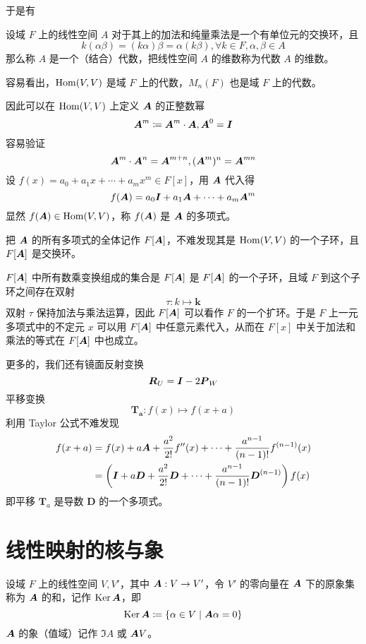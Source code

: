 于是有

\begin{definition}[代数]
    设域 $F$ 上的线性空间 $A$ 对于其上的加法和纯量乘法是一个有单位元的交换环，且
    \[ k(\alpha \beta) = (k\alpha)\beta = \alpha(k\beta), \forall k \in F,\alpha,\beta \in A \]
    那么称 $A$ 是一个（结合）代数，把线性空间 $A$ 的维数称为代数 $A$ 的维数。
\end{definition}

容易看出，$\operatorname{Hom}(V,V)$ 是域 $F$ 上的代数，$M_n(F)$ 也是域 $F$ 上的代数。

因此可以在 $\operatorname{Hom}(V,V)$ 上定义 $\boldsymbol{A}$ 的正整数幂
\[ \boldsymbol{A}^m \coloneqq \boldsymbol{A}^m \cdot \boldsymbol{A}, \boldsymbol{A}^0 = \boldsymbol{I} \]
容易验证
\[ \boldsymbol{A}^m \cdot \boldsymbol{A}^n = \boldsymbol{A}^{m+n}, (\boldsymbol{A}^m)^n = \boldsymbol{A}^{mn} \]
设 $f(x) = a_0 + a_1 x + \cdots + a_mx^m \in F[x]$，用 $\boldsymbol{A}$ 代入得
\[ f(\boldsymbol{A}) = a_0\boldsymbol{I} + a_1\boldsymbol{A} + \cdots + a_m \boldsymbol{A}^m \]
显然 $f(\boldsymbol{A}) \in \operatorname{Hom}(V,V)$，称 $f(\boldsymbol{A})$ 是 $\boldsymbol{A}$ 的多项式。

把 $\boldsymbol{A}$ 的所有多项式的全体记作 $F[\boldsymbol{A}]$，不难发现其是 $\operatorname{Hom}(V,V)$ 的一个子环，且 $F[\boldsymbol{A}]$ 是交换环。

$F[\boldsymbol{A}]$ 中所有数乘变换组成的集合是 $F[\boldsymbol{A}]$ 是 $F[\boldsymbol{A}]$ 的一个子环，且域 $F$ 到这个子环之间存在双射
\[ \tau : k \mapsto \boldsymbol{k} \]
双射 $\tau$ 保持加法与乘法运算，因此 $F[\boldsymbol{A}]$ 可以看作 $F$ 的一个扩环。于是 $F$ 上一元多项式中的不定元 $x$ 可以用 $F[\boldsymbol{A}]$ 中任意元素代入，从而在 $F[x]$ 中关于加法和乘法的等式在 $F[\boldsymbol{A}]$ 中也成立。

更多的，我们还有镜面反射变换
\[ \boldsymbol{R}_U = \boldsymbol{I} - 2\boldsymbol{P}_W \]
平移变换
\[ \boldsymbol{T_a} : f(x) \mapsto f(x+a) \]
利用 Taylor 公式不难发现
\begin{equation*}
    \begin{aligned}
        f(x+a) &= f(x) + a\boldsymbol{A} + \frac{a^2}{2!}f''(x) + \cdots + \frac{a^{n-1}}{(n-1)!} f^{(n-1)}(x)\\
        &= \left( \boldsymbol{I} + a\boldsymbol{D} + \frac{a^2}{2!}\boldsymbol{D} + \cdots + \frac{a^{n-1}}{(n-1)!} \boldsymbol{D}^{(n-1)} \right)f(x)
    \end{aligned}
\end{equation*}
即平移 $\boldsymbol{T}_a$ 是导数 $\boldsymbol{D}$ 的一个多项式。

\section{线性映射的核与象}

\begin{definition}[核] 
    设域 $F$ 上的线性空间 $V,V'$，其中 $\boldsymbol{A} : V \to V'$，令 $V'$ 的零向量在 $\boldsymbol{A}$ 下的原象集称为 $\boldsymbol{A}$ 的和，记作 $\operatorname{Ker} \boldsymbol{A}$，即
    \[ \operatorname{Ker} \boldsymbol{A} \coloneqq \{ \alpha \in V \mid \boldsymbol{A}\alpha = 0 \} \]
    $\boldsymbol{A}$ 的象（值域）记作 $\Im A$ 或 $\boldsymbol{A} V$。
\end{definition}

